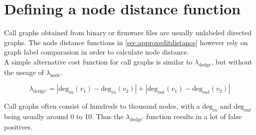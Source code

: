 \documentclass[
    12pt,                               %
    DIV=14,                     %
    parskip=half+,              %
    bigheadings,                %
    cleardoubleempty,   %
    halfparskip,                %
    ]{scrreprt} %
\begin{document}
\section{Defining a node distance function} \label{sec:customattributes}
Call graphs obtained from binary or firmware files are usually unlabeled directed graphs. The node distance functions in \ref{sec:approxeditdistance} however rely on graph label comparasion in order to calculate node distance. \\
A simple alternative cost function for call graphs is similar to $\lambda_{\text{dedge}}$, but without the useage of $\lambda_{\text{node}}$.

\begin{equation}
	\lambda_{\text{dedge'}} = |\text{deg}_{in}(v_1) - \text{deg}_{in}(v_2)| + |\text{deg}_{out}(v_1) - \text{deg}_{out}(v_2)|
\end{equation}

Call graphs often consist of hundreds to thousand nodes, with a $\text{deg}_{in}$ and $\text{deg}_{out}$ being usually around 0 to 10. Thus the $\lambda_{\text{dedge'}}$ function results in a lot of false positives.
\end{document}
